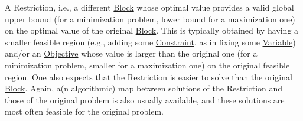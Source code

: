 \begin{DoxyItemize}
\item A Restriction, i.\+e., a different \mbox{\hyperlink{class_s_m_spp__di__unipi__it_1_1_block}{Block}} whose optimal value provides a valid global upper bound (for a minimization problem, lower bound for a maximization one) on the optimal value of the original \mbox{\hyperlink{class_s_m_spp__di__unipi__it_1_1_block}{Block}}. This is typically obtained by having a smaller feasible region (e.\+g., adding some \mbox{\hyperlink{class_s_m_spp__di__unipi__it_1_1_constraint}{Constraint}}, as in fixing some \mbox{\hyperlink{class_s_m_spp__di__unipi__it_1_1_variable}{Variable}}) and/or an \mbox{\hyperlink{class_s_m_spp__di__unipi__it_1_1_objective}{Objective}} whose value is larger than the original one (for a minimization problem, smaller for a maximization one) on the original feasible region. One also expects that the Restriction is easier to solve than the original \mbox{\hyperlink{class_s_m_spp__di__unipi__it_1_1_block}{Block}}. Again, a(n algorithmic) map between solutions of the Restriction and those of the original problem is also usually available, and these solutions are most often feasible for the original problem.
\end{DoxyItemize}

